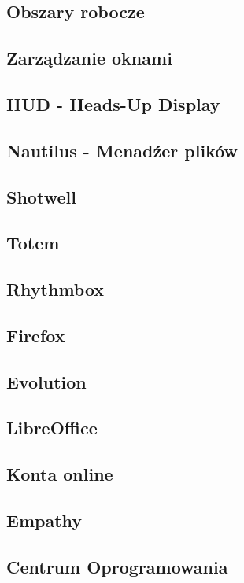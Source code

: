\documentclass[a4paper,11pt,oneside]{mwart}
\begin{document}
        	\subsection{Obszary robocze}
        		
        	\subsection{Zarządzanie oknami}
        		
        \subsection{HUD - Heads-Up Display}
    		    	
        \subsection{Nautilus - Menadźer plików}
			        
        \subsection{Shotwell}
        \subsection{Totem}
        \subsection{Rhythmbox}
        \subsection{Firefox}
        \subsection{Evolution}
        \subsection{LibreOffice}
        \subsection{Konta online}
        \subsection{Empathy}
        \subsection{Centrum Oprogramowania}
\end{document}
